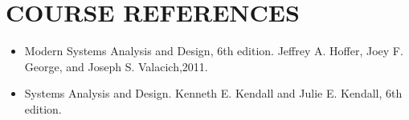 \hypertarget{course-references}{%
\section{COURSE REFERENCES}\label{course-references}}

\begin{itemize}
\tightlist
\item
  Modern Systems Analysis and Design, 6th edition. Jeffrey A. Hoffer,
  Joey F. George, and Joseph S. Valacich,2011.
\item
  Systems Analysis and Design. Kenneth E. Kendall and Julie E. Kendall,
  6th edition.
\end{itemize}
